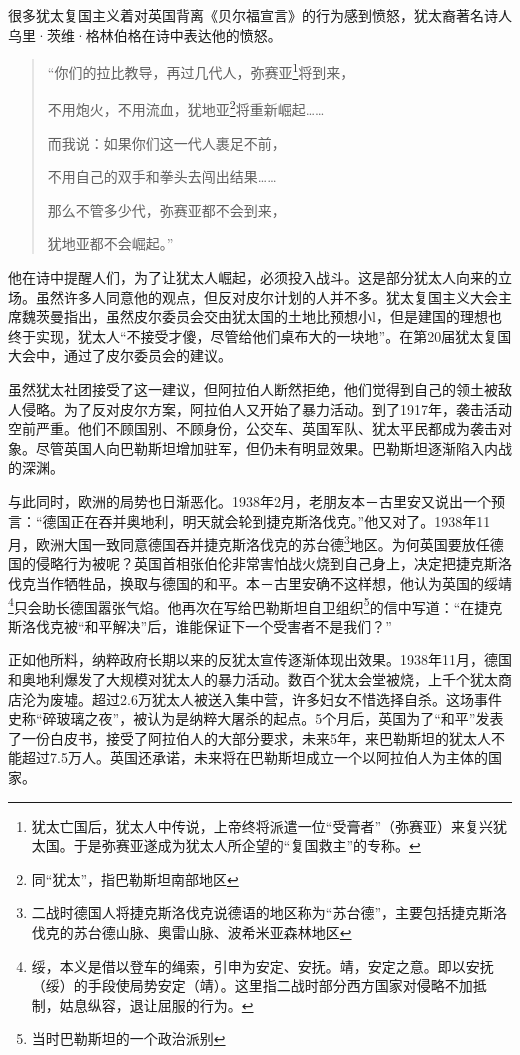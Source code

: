 \documentclass{article}
\begin{document}
很多犹太复国主义着对英国背离《贝尔福宣言》的行为感到愤怒，犹太裔著名诗人乌里·茨维·格林伯格在诗中表达他的愤怒。
\begin{quote}
    “你们的拉比教导，再过几代人，弥赛亚\footnote[1]{犹太亡国后，犹太人中传说，上帝终将派遣一位“受膏者”（弥赛亚）来复兴犹太国。于是弥赛亚遂成为犹太人所企望的“复国救主”的专称。}将到来，

    不用炮火，不用流血，犹地亚\footnote{同“犹太”，指巴勒斯坦南部地区}将重新崛起……

    而我说：如果你们这一代人裹足不前，

    不用自己的双手和拳头去闯出结果……

    那么不管多少代，弥赛亚都不会到来，

    犹地亚都不会崛起。”
\end{quote}
他在诗中提醒人们，为了让犹太人崛起，必须投入战斗。这是部分犹太人向来的立场。虽然许多人同意他的观点，但反对皮尔计划的人并不多。犹太复国主义大会主席魏茨曼指出，虽然皮尔委员会交由犹太国的土地比预想小l，但是建国的理想也终于实现，犹太人“不接受才傻，尽管给他们桌布大的一块地”。在第20届犹太复国大会中，通过了皮尔委员会的建议。

虽然犹太社团接受了这一建议，但阿拉伯人断然拒绝，他们觉得到自己的领土被敌人侵略。为了反对皮尔方案，阿拉伯人又开始了暴力活动。到了1917年，袭击活动空前严重。他们不顾国别、不顾身份，公交车、英国军队、犹太平民都成为袭击对象。尽管英国人向巴勒斯坦增加驻军，但仍未有明显效果。巴勒斯坦逐渐陷入内战的深渊。

与此同时，欧洲的局势也日渐恶化。1938年2月，老朋友本－古里安又说出一个预言：“德国正在吞并奥地利，明天就会轮到捷克斯洛伐克。”他又对了。1938年11月，欧洲大国一致同意德国吞并捷克斯洛伐克的苏台德\footnote[1]{二战时德国人将捷克斯洛伐克说德语的地区称为“苏台德”，主要包括捷克斯洛伐克的苏台德山脉、奥雷山脉、波希米亚森林地区}地区。为何英国要放任德国的侵略行为被呢？英国首相张伯伦非常害怕战火烧到自己身上，决定把捷克斯洛伐克当作牺牲品，换取与德国的和平。本－古里安确不这样想，他认为英国的绥靖\footnote[2]{绥，本义是借以登车的绳索，引申为安定、安抚。靖，安定之意。即以安抚（绥）的手段使局势安定（靖）。这里指二战时部分西方国家对侵略不加抵制，姑息纵容，退让屈服的行为。}只会助长德国嚣张气焰。他再次在写给巴勒斯坦自卫组织\footnote{当时巴勒斯坦的一个政治派别}的信中写道：“在捷克斯洛伐克被“和平解决”后，谁能保证下一个受害者不是我们？”

正如他所料，纳粹政府长期以来的反犹太宣传逐渐体现出效果。1938年11月，德国和奥地利爆发了大规模对犹太人的暴力活动。数百个犹太会堂被烧，上千个犹太商店沦为废墟。超过2.6万犹太人被送入集中营，许多妇女不惜选择自杀。这场事件史称“碎玻璃之夜”，被认为是纳粹大屠杀的起点。5个月后，英国为了“和平”发表了一份白皮书，接受了阿拉伯人的大部分要求，未来5年，来巴勒斯坦的犹太人不能超过7.5万人。英国还承诺，未来将在巴勒斯坦成立一个以阿拉伯人为主体的国家。
\end{document}
